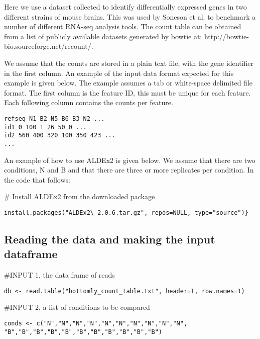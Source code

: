 \documentclass[11pt]{amsart}
\begin{document}
Here we use a dataset collected to identify differentially expressed genes in two different strains of mouse brains. This was used by Soneson et al. \cite{Soneson:2013} to benchmark a number of different RNA-seq analysis tools. The count table can be obtained from a list of  publicly available datasets generated by bowtie at: http://bowtie-bio.sourceforge.net/recount/.

We assume that the counts are stored in a plain text file, with the gene identifier in the first column. An example of the input data format expected for this example is given below. The example assumes a tab or white-space delimited file format. The first column is the feature ID, this must be unique for each feature. Each following column contains the counts per feature.
\begin{verbatim}
refseq N1 B2 N5 B6 B3 N2 ...
id1 0 100 1 26 50 0 ...
id2 560 400 320 100 350 423 ...
...
\end{verbatim}

An example of how to use ALDEx2 is given below. We assume that there are two conditions, N and B and that there are three or more replicates per condition. In the code that follows:


\noindent \#  Install ALDEx2 from the downloaded package\\
\begin{verbatim}install.packages("ALDEx2\_2.0.6.tar.gz", repos=NULL, type="source")}
\end{verbatim}

\subsection{Reading the data and making the input dataframe}

\noindent\#INPUT 1, the data frame of reads\\
\begin{verbatim}db <- read.table("bottomly_count_table.txt", header=T, row.names=1)\end{verbatim}

\noindent\#INPUT 2, a list of conditions to be compared\\
\begin{verbatim}conds <- c("N","N","N","N","N","N","N","N","N","N",
"B","B","B","B","B","B","B","B","B","B","B")
\end{verbatim}
\end{document}
